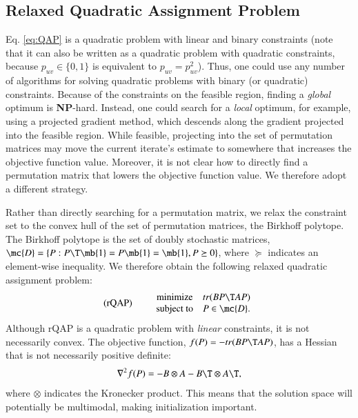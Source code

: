 \documentclass[preprint,11pt]{elsarticle}
\begin{document}
\subsection{Relaxed Quadratic Assignment Problem}

Eq. \ref{eq:QAP} is a quadratic problem with linear and binary constraints (note that it can also be written as a quadratic problem with quadratic constraints, because $p_{uv} \in \{0,1\}$ is equivalent to $p_{uv}=p_{uv}^2$).  Thus, one could use any number of algorithms for solving quadratic problems with binary (or quadratic) constraints.  Because of the constraints on the feasible region, finding a \emph{global} optimum is \textbf{NP}-hard.  Instead, one could search for a \emph{local} optimum, for example, using a projected gradient method, which descends along the gradient projected into the feasible region.  While feasible, projecting into the set of permutation matrices may move the current iterate's estimate to somewhere that increases the objective function value.  Moreover, it is not clear how to directly find a permutation matrix that lowers the objective function value.  We therefore adopt a different strategy.

Rather than directly searching for a permutation matrix, we relax the constraint set to the convex hull of the set of permutation matrices, the Birkhoff polytope.  The Birkhoff polytope is the set of doubly stochastic matrices, $\mc{D}=\{P : P\T \mb{1} =  P \mb{1} = \mb{1}, P \succeq 0\}$, where $\succeq$ indicates an element-wise inequality. We therefore obtain the following relaxed quadratic assignment problem:
\begin{equation}
\text{(rQAP)} \qquad  
\begin{array}{cl}
			\text{minimize}   & tr(B P\T AP) \\
			\text{subject to}  &P \in \mc{D}.   
\end{array}\label{eq:rQAP}
\end{equation}
Although rQAP is a quadratic problem with \emph{linear} constraints, it is not necessarily convex.  The objective function, $f(P)=- tr(B P\T AP)$, has a Hessian that is not necessarily positive definite:
\begin{align*}
	\nabla^2 f(P)  =  - B \otimes A - B\T \otimes A\T,
\end{align*}
where $\otimes$ indicates the Kronecker product. This means that the solution space will potentially be multimodal, making initialization important.  
\end{document}
